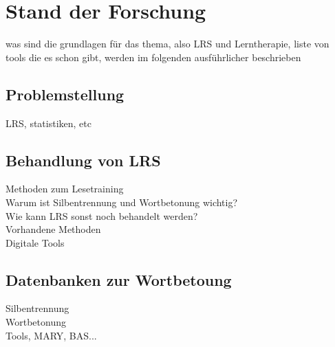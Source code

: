 
\chapter{Stand der Forschung}

was sind die grundlagen für das thema, also LRS und Lerntherapie, liste von tools die es schon gibt, werden im folgenden ausführlicher beschrieben

\section{Problemstellung}

LRS, statistiken, etc

\section{Behandlung von LRS}
Methoden zum Lesetraining\\
Warum ist Silbentrennung und Wortbetonung wichtig?\\
Wie kann LRS sonst noch behandelt werden?\\

Vorhandene Methoden\\
Digitale Tools\\

\section{Datenbanken zur Wortbetoung}
Silbentrennung\\
Wortbetonung\\
Tools, MARY, BAS...